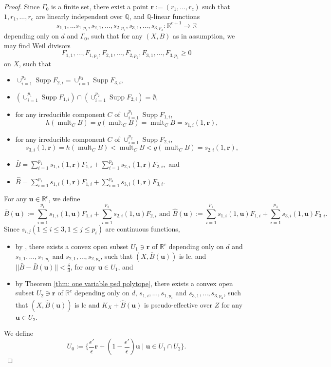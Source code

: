 \documentclass[11pt]{amsart}
\numberwithin{equation}{section}
\newcommand{\Qq}{\mathbb{Q}}
\newcommand{\Rr}{\mathbb{R}}
\newcommand{\Supp}{\operatorname{Supp}}
\newcommand{\mult}{\operatorname{mult}}
\newcommand{\Ii}{{\Gamma}}
\theoremstyle{definition}
\theoremstyle{definition}
\begin{document}
\begin{proof}
Since $\Ii_0$ is a finite set, there exist a point $\bm{r}:=(r_1,\dots,r_c)$ such that $1,r_1,\dots,r_c$ are linearly independent over $\Qq$, and $\Qq$-linear functions $$s_{1,1},\dots s_{1,p_1},s_{2,1},\dots,s_{2,p_2},s_{3,1},\dots,s_{3,p_3}:\Rr^{c+1}\rightarrow\Rr$$ depending only on $d$ and $\Ii_0$, such that for any $(X,B)$ as in assumption, we may find Weil divisors $$F_{1,1},\dots,F_{1,p_1},F_{2,1},\dots,F_{2,p_2},F_{3,1},\dots,F_{3,p_3}\geq 0$$ on $X$, such that
\begin{itemize}
    \item $\cup_{i=1}^{p_2}\Supp F_{2,i}=\cup_{i=1}^{p_3}\Supp F_{3,i},$
    \item $(\cup_{i=1}^{p_1}\Supp F_{1,i})\cap (\cup_{i=1}^{p_2}\Supp F_{2,i})=\emptyset,$
    \item for any irreducible component $C$ of $\cup_{i=1}^{p_1}\Supp F_{1,i}$, $$h(\mult_CB)=g(\mult_CB)=\mult_CB=s_{1,i}(1,\bm{r}),$$
    \item for any irreducible component $C$ of $\cup_{i=1}^{p_2}\Supp F_{2,i}$, $$s_{3,i}(1,\bm{r})=h(\mult_CB)<\mult_CB<g(\mult_CB)=s_{2,i}(1,\bm{r}),$$
    \item $\bar B=\sum_{i=1}^{p_1}s_{1,i}(1,\bm{r})F_{1,i}+\sum_{i=1}^{p_2}s_{2,i}(1,\bm{r})F_{2,i},$ and
    \item $\widehat B=\sum_{i=1}^{p_1}s_{1,i}(1,\bm{r})F_{1,i}+\sum_{i=1}^{p_3}s_{3,i}(1,\bm{r})F_{3,i}.$
\end{itemize}
For any $\bm{u}\in\Rr^c$, we define 
$$\bar B(\bm{u}):=\sum_{i=1}^{p_1}s_{1,i}(1,\bm{u})F_{1,i}+\sum_{i=1}^{p_2}s_{2,i}(1,\bm{u})F_{2,i}\text{ and }\widehat B(\bm{u}):=\sum_{i=1}^{p_1}s_{1,i}(1,\bm{u})F_{1,i}+\sum_{i=1}^{p_3}s_{3,i}(1,\bm{u})F_{3,i}.$$
Since $s_{i,j}(1\le i\le 3,1\le j\le p_i)$ are continuous functions,
\begin{itemize}
    \item by \cite[Corollary 5.5]{HLS19}, there exists a convex open subset $U_1\ni\bm{r}$ of $\Rr^c$ depending only on $d$ and $s_{1,1},\dots,s_{1,p_1}$ and $s_{2,1},\dots,s_{2,p_2}$, such that $(X,\bar B(\bm{u}))$ is lc, and $||\bar B-\bar B(\bm{u})||<\frac{\delta}{3}$, for any $\bm{u}\in U_1$, and
    \item by Theorem \ref{thm: one variable psd polytope}, there exists a convex open subset $U_2\ni\bm{r}$ of $\Rr^c$ depending only on $d$, $s_{1,i},\dots,s_{1,p_1}$ and $s_{3,1},\dots,s_{3,p_3}$, such that $(X,\widehat B(\bm{u}))$ is lc and $K_X+\widehat B(\bm{u})$ is pseudo-effective over $Z$ for any $\bm{u}\in U_2$.
\end{itemize}
We define 
$$U_0:=\{\frac{\epsilon'}{\epsilon}\bm{r}+(1-\frac{\epsilon'}{\epsilon})\bm{u}\mid \bm{u}\in U_1\cap U_2\}.$$


\end{proof}
\end{document}
